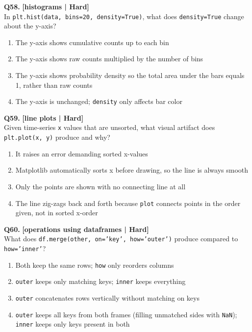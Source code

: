 \noindent\textbf{Q58.} \hfill {\small\color{LPUOrange}\textbf{[histograms | Hard]}}\\[2pt]
In \texttt{plt.hist(data, bins=20, density=True)}, what does \texttt{density=True} change about the y-axis?

\begin{enumerate}[label=(\alph*),topsep=2pt,itemsep=1pt,partopsep=0pt,parsep=0pt]
    \item \relax The y-axis shows cumulative counts up to each bin
    \item \relax The y-axis shows raw counts multiplied by the number of bins
    \item \relax The y-axis shows probability density so the total area under the bars equals 1, rather than raw counts
    \item \relax The y-axis is unchanged; \texttt{density} only affects bar color
\end{enumerate}
\vspace{2mm}

\noindent\textbf{Q59.} \hfill {\small\color{LPUOrange}\textbf{[line plots | Hard]}}\\[2pt]
Given time-series \texttt{x} values that are unsorted, what visual artifact does \texttt{plt.plot(x, y)} produce and why?

\begin{enumerate}[label=(\alph*),topsep=2pt,itemsep=1pt,partopsep=0pt,parsep=0pt]
    \item \relax It raises an error demanding sorted x-values
    \item \relax Matplotlib automatically sorts x before drawing, so the line is always smooth
    \item \relax Only the points are shown with no connecting line at all
    \item \relax The line zig-zags back and forth because \texttt{plot} connects points in the order given, not in sorted x-order
\end{enumerate}
\vspace{2mm}

\noindent\textbf{Q60.} \hfill {\small\color{LPUOrange}\textbf{[operations using dataframes | Hard]}}\\[2pt]
What does \texttt{df.merge(other, on='key', how='outer')} produce compared to \texttt{how='inner'}?

\begin{enumerate}[label=(\alph*),topsep=2pt,itemsep=1pt,partopsep=0pt,parsep=0pt]
    \item \relax Both keep the same rows; \texttt{how} only reorders columns
    \item \relax \texttt{outer} keeps only matching keys; \texttt{inner} keeps everything
    \item \relax \texttt{outer} concatenates rows vertically without matching on keys
    \item \relax \texttt{outer} keeps all keys from both frames (filling unmatched sides with \texttt{NaN}); \texttt{inner} keeps only keys present in both
\end{enumerate}
\vspace{2mm}


